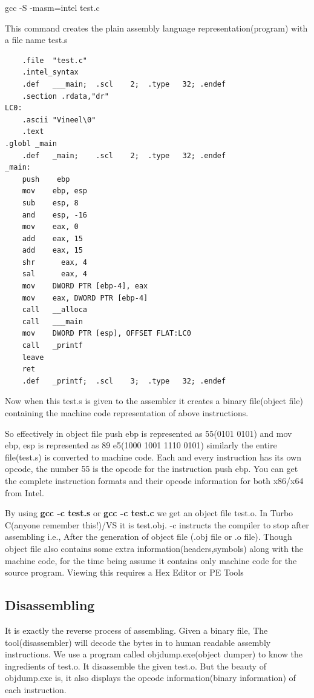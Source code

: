 \documentclass{article}
\begin{document}
    gcc -S -masm=intel test.c

This command creates the plain assembly language representation(program) with a file name test.s
\begin{verbatim}
    .file  "test.c"
    .intel_syntax
    .def   ___main;  .scl    2;  .type   32; .endef
    .section .rdata,"dr"
LC0:
    .ascii "Vineel\0"
    .text
.globl _main
    .def   _main;    .scl    2;  .type   32; .endef
_main:
    push    ebp
    mov    ebp, esp
    sub    esp, 8
    and    esp, -16
    mov    eax, 0
    add    eax, 15
    add    eax, 15
    shr      eax, 4
    sal      eax, 4
    mov    DWORD PTR [ebp-4], eax
    mov    eax, DWORD PTR [ebp-4]
    call   __alloca
    call   ___main
    mov    DWORD PTR [esp], OFFSET FLAT:LC0
    call   _printf
    leave
    ret
    .def   _printf;  .scl    3;  .type   32; .endef
\end{verbatim}
Now when this test.s is given to the assembler it creates a binary file(object file) containing the machine code representation of above instructions.

So effectively in object file push ebp is represented as 55(0101 0101) and mov ebp, esp is represented as 89 e5(1000 1001 1110 0101) similarly the entire file(test.s) is converted to machine code. Each and every instruction has its own opcode, the number 55 is the opcode for the instruction push ebp. You can get the complete instruction formats and their opcode information for both x86/x64 from Intel.

By using {\textbf{gcc -c test.s}} or {\textbf{gcc -c test.c}} we get an object file test.o. In Turbo C(anyone remember this!)/VS it is test.obj. -c instructs the compiler to stop after assembling i.e., After the generation of object file (.obj file or .o file). Though object file also contains some extra information(headers,symbols) along with the machine code, for the time being assume it contains only machine code for the source program. Viewing this requires a Hex Editor or PE Tools

\subsection{Disassembling}
It is exactly the reverse process of assembling. Given a binary file, The tool(disassembler) will decode the bytes in to human readable assembly instructions. We use a program called objdump.exe(object dumper) to know the ingredients of test.o. It disassemble the given test.o. But the beauty of objdump.exe is, it also displays the opcode information(binary information) of each instruction.
\end{document}
